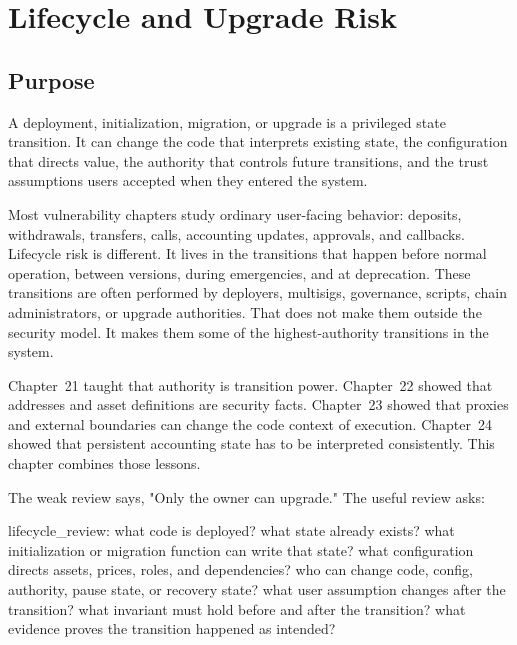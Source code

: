 \chapter{Lifecycle and Upgrade Risk}

\section{Purpose}

\begin{principlebox}
A deployment, initialization, migration, or upgrade is a privileged state transition. It can change the code that interprets existing state, the configuration that directs value, the authority that controls future transitions, and the trust assumptions users accepted when they entered the system.
\end{principlebox}

Most vulnerability chapters study ordinary user-facing behavior: deposits, withdrawals, transfers, calls, accounting updates, approvals, and callbacks. Lifecycle risk is different. It lives in the transitions that happen before normal operation, between versions, during emergencies, and at deprecation. These transitions are often performed by deployers, multisigs, governance, scripts, chain administrators, or upgrade authorities. That does not make them outside the security model. It makes them some of the highest-authority transitions in the system.

Chapter~21 taught that authority is transition power. Chapter~22 showed that addresses and asset definitions are security facts. Chapter~23 showed that proxies and external boundaries can change the code context of execution. Chapter~24 showed that persistent accounting state has to be interpreted consistently. This chapter combines those lessons.

The weak review says, "Only the owner can upgrade." The useful review asks:

\begin{codeblock}
lifecycle_review:
    what code is deployed?
    what state already exists?
    what initialization or migration function can write that state?
    what configuration directs assets, prices, roles, and dependencies?
    who can change code, config, authority, pause state, or recovery state?
    what user assumption changes after the transition?
    what invariant must hold before and after the transition?
    what evidence proves the transition happened as intended?
\end{codeblock}

